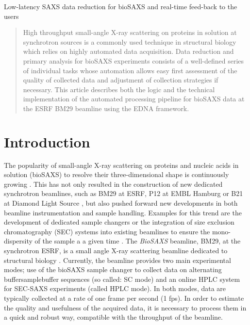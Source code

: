 \documentclass[preprint,pdf]{iucr}              %
\begin{document}

\maketitle                        %

\begin{synopsis}
Low-latency SAXS data reduction for bioSAXS and real-time feed-back to the users
\end{synopsis}

\begin{abstract}
High throughput small-angle X-ray scattering on proteins in solution at
synchrotron sources is a commonly used technique in structural biology which
relies on highly automated data acquisition.
Data reduction and primary analysis for bioSAXS experiments consists of a
well-defined series of individual tasks whose automation allows easy first
assessment of the quality of collected data and adjustment of collection strategies if necessary.
This article describes both the logic and the technical implementation of the
automated processing pipeline for bioSAXS data at the ESRF BM29 beamline using
the EDNA framework.
\end{abstract}


\section{Introduction}
The popularity of small-angle X-ray scattering on proteins and nucleic acids in
solution (bioSAXS) to resolve their three-dimensional shape is continuously
growing \cite{Graewert2013,Hura2009,Reyes2014}.
This has not only resulted in the construction of new dedicated
synchrotron beamlines, such as BM29 at ESRF, P12 at EMBL Hamburg or B21 at
Diamond Light Source \cite{BM29paper,P12,B21}, but also pushed forward new
developments in both beamline instrumentation and sample handling.
Examples for this trend are the development of dedicated sample changers
\cite{SCpaper} or the integration of size exclusion chromatography (SEC) systems
into existing beamlines to ensure the mono-dispersity of the sample a a given
time \cite{SECPaper2012,SECP12,SECSWING}.
The \textit{BioSAXS} beamline, BM29, at the synchrotron ESRF, is a small angle
X-ray scattering beamline dedicated to structural biology \cite{BM29paper}.
Currently, the beamline provides two main experimental modes; use of the
bioSAXS sample changer to collect data on alternating buffer\/sample\/buffer
sequences (so called: SC mode) and an online HPLC system \cite{SECPaper2012} for
SEC-SAXS experiments (called HPLC mode).
In both modes, data are typically collected at a rate of one frame per second
(1 fps).
In order to estimate the quality and usefulness of the acquired data, it is
necessary to process them in a quick and robust way, compatible with the
throughput of the beamline.
\end{document}
